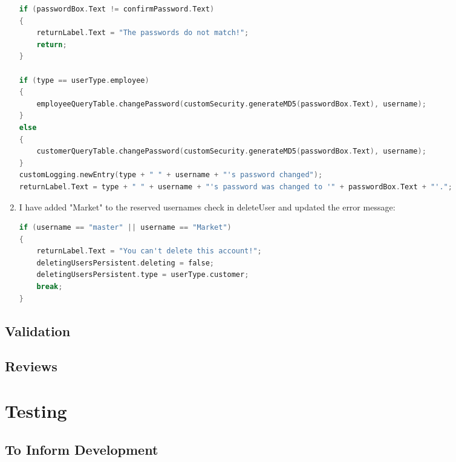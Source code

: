 ﻿\documentclass{article}
\begin{document}
\begin{enumerate}
\begin{lstlisting}[language=C]
if (passwordBox.Text != confirmPassword.Text)
{
    returnLabel.Text = "The passwords do not match!";
    return;
}

if (type == userType.employee)
{
    employeeQueryTable.changePassword(customSecurity.generateMD5(passwordBox.Text), username);
}
else
{
    customerQueryTable.changePassword(customSecurity.generateMD5(passwordBox.Text), username);
}
customLogging.newEntry(type + " " + username + "'s password changed");
returnLabel.Text = type + " " + username + "'s password was changed to '" + passwordBox.Text + "'.";
        \end{lstlisting}
        \item I have added "Market" to the reserved usernames check in deleteUser and updated the error message:
        \begin{lstlisting}[language=C]
if (username == "master" || username == "Market")
{
    returnLabel.Text = "You can't delete this account!";
    deletingUsersPersistent.deleting = false;
    deletingUsersPersistent.type = userType.customer;
    break;
}
        \end{lstlisting}
    \end{enumerate}
    \subsection{Validation}
    \subsection{Reviews}
    
    
    \section{Testing}
    \subsection{To Inform Development}
\end{document}
